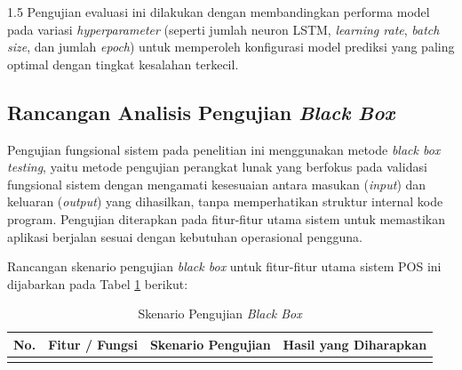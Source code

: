\documentclass[12pt, a4paper, onecolumn, oneside]{report}
\begin{document}
\begin{spacing}{1.5}
Pengujian evaluasi ini dilakukan dengan membandingkan performa model pada variasi \textit{hyperparameter} (seperti jumlah neuron LSTM, \textit{learning rate}, \textit{batch size}, dan jumlah \textit{epoch}) untuk memperoleh konfigurasi model prediksi yang paling optimal dengan tingkat kesalahan terkecil.

\subsection{Rancangan Analisis Pengujian \textit{Black Box}}

Pengujian fungsional sistem pada penelitian ini menggunakan metode \textit{black box testing}, yaitu metode pengujian perangkat lunak yang berfokus pada validasi fungsional sistem dengan mengamati kesesuaian antara masukan (\textit{input}) dan keluaran (\textit{output}) yang dihasilkan, tanpa memperhatikan struktur internal kode program. Pengujian diterapkan pada fitur-fitur utama sistem untuk memastikan aplikasi berjalan sesuai dengan kebutuhan operasional pengguna.

Rancangan skenario pengujian \textit{black box} untuk fitur-fitur utama sistem POS ini dijabarkan pada Tabel \ref{tab:blackbox} berikut:

{
\begin{longtable}{|>{\centering\arraybackslash}p{0.6cm}|>{\raggedright\arraybackslash}p{3.0cm}|>{\raggedright\arraybackslash}p{4.7cm}|>{\raggedright\arraybackslash}p{4.7cm}|}
\caption{Skenario Pengujian \textit{Black Box}} \label{tab:blackbox} \\
\hline
\textbf{No.} & \textbf{Fitur / Fungsi} & \textbf{Skenario Pengujian} & \textbf{Hasil yang Diharapkan} \\
\hline
\endfirsthead

\endhead

\hline
\endfoot
\hline
\endlastfoot


\end{longtable}}
\end{spacing}
\end{document}
